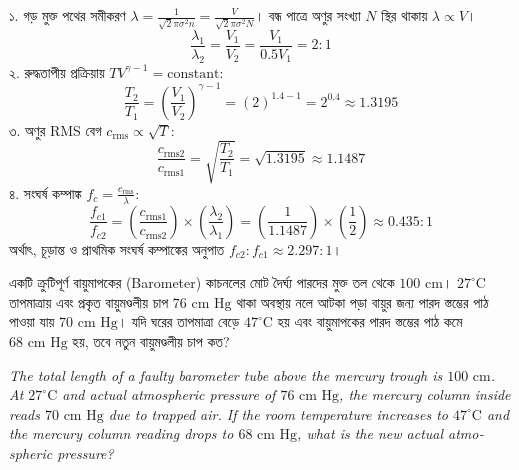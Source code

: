 \documentclass[12pt, a4paper]{article}
\begin{document}
\begin{tcolorbox}[solutionbox={সমাধান (Solution)}]
\noindent
১. গড় মুক্ত পথের সমীকরণ $\lambda = \frac{1}{\sqrt{2} \pi \sigma^2 n} = \frac{V}{\sqrt{2} \pi \sigma^2 N}$। বন্ধ পাত্রে অণুর সংখ্যা $N$ স্থির থাকায় $\lambda \propto V$।
\[ \frac{\lambda_1}{\lambda_2} = \frac{V_1}{V_2} = \frac{V_1}{0.5 V_1} = 2 : 1 \]
২. রুদ্ধতাপীয় প্রক্রিয়ায় $T V^{\gamma-1} = \text{constant}$:
\[ \frac{T_2}{T_1} = \left(\frac{V_1}{V_2}\right)^{\gamma-1} = (2)^{1.4 - 1} = 2^{0.4} \approx 1.3195 \]
৩. অণুর RMS বেগ $c_{\text{rms}} \propto \sqrt{T}$:
\[ \frac{c_{\text{rms2}}}{c_{\text{rms1}}} = \sqrt{\frac{T_2}{T_1}} = \sqrt{1.3195} \approx 1.1487 \]
৪. সংঘর্ষ কম্পাঙ্ক $f_c = \frac{c_{\text{rms}}}{\lambda}$:
\[ \frac{f_{c1}}{f_{c2}} = \left(\frac{c_{\text{rms1}}}{c_{\text{rms2}}}\right) \times \left(\frac{\lambda_2}{\lambda_1}\right) = \left(\frac{1}{1.1487}\right) \times \left(\frac{1}{2}\right) \approx 0.435 : 1 \]
অর্থাৎ, চূড়ান্ত ও প্রাথমিক সংঘর্ষ কম্পাঙ্কের অনুপাত $f_{c2} : f_{c1} \approx 2.297 : 1$।
\end{tcolorbox}
\begin{tcolorbox}[questionbox={প্রশ্ন (Question) 6}]
\noindent
একটি ক্রুটিপূর্ণ বায়ুমাপকের (Barometer) কাচনলের মোট দৈর্ঘ্য পারদের মুক্ত তল থেকে $100\text{ cm}$। $27^\circ\text{C}$ তাপমাত্রায় এবং প্রকৃত বায়ুমণ্ডলীয় চাপ $76\text{ cm Hg}$ থাকা অবস্থায় নলে আটকা পড়া বায়ুর জন্য পারদ স্তম্ভের পাঠ পাওয়া যায় $70\text{ cm Hg}$। যদি ঘরের তাপমাত্রা বেড়ে $47^\circ\text{C}$ হয় এবং বায়ুমাপকের পারদ স্তম্ভের পাঠ কমে $68\text{ cm Hg}$ হয়, তবে নতুন বায়ুমণ্ডলীয় চাপ কত?

\vspace{0.8em}
\begin{english}
\noindent\textit{\color{darkgray}
The total length of a faulty barometer tube above the mercury trough is $100\text{ cm}$. At $27^\circ\text{C}$ and actual atmospheric pressure of $76\text{ cm Hg}$, the mercury column inside reads $70\text{ cm Hg}$ due to trapped air. If the room temperature increases to $47^\circ\text{C}$ and the mercury column reading drops to $68\text{ cm Hg}$, what is the new actual atmospheric pressure?
}
\end{english}
\end{tcolorbox}

\vspace{1em}
\end{document}
